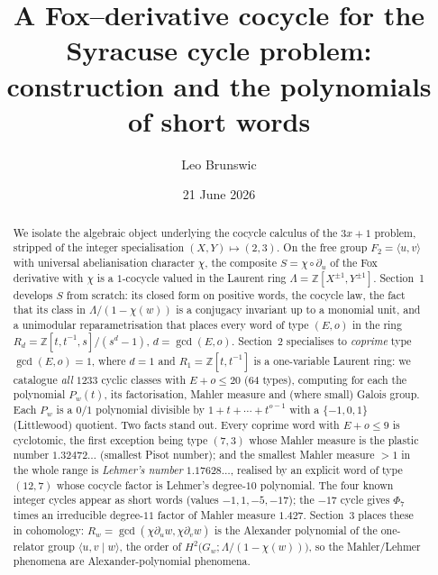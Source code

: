 \documentclass[11pt,a4paper]{article}
\title{A Fox--derivative cocycle for the Syracuse cycle problem:\\
       construction and the polynomials of short words}
\author{Leo Brunswic}
\date{21 June 2026}
\theoremstyle{bourbaki}
\theoremstyle{bourbakidef}
\newcommand{\Z}{\mathbb{Z}}
\newcommand{\Lam}{\Lambda}
\begin{document}
\maketitle

\begin{abstract}
We isolate the algebraic object underlying the cocycle calculus of the $3x+1$ problem,
stripped of the integer specialisation $(X,Y)\mapsto(2,3)$. On the free group $F_2=\langle
u,v\rangle$ with universal abelianisation character $\chi$, the composite $S=\chi\circ
\partial_u$ of the Fox derivative with $\chi$ is a $1$-cocycle valued in the Laurent ring
$\Lam=\Z[X^{\pm1},Y^{\pm1}]$. Section~1 develops $S$ from scratch: its closed form on
positive words, the cocycle law, the fact that its class in $\Lam/(1-\chi(w))$ is a
conjugacy invariant up to a monomial unit, and a unimodular reparametrisation that places
every word of type $(E,o)$ in the ring $R_d=\Z[t,t^{-1},s]/(s^d-1)$, $d=\gcd(E,o)$.
Section~2 specialises to \emph{coprime} type $\gcd(E,o)=1$, where $d=1$ and $R_1=\Z[t,t^{-1}]$
is a one-variable Laurent ring: we catalogue \emph{all} $1233$ cyclic classes with $E+o\le20$
($64$ types), computing for each the polynomial $P_w(t)$, its factorisation, Mahler measure
and (where small) Galois group. Each $P_w$ is a $0/1$ polynomial divisible by
$1+t+\cdots+t^{o-1}$ with a $\{-1,0,1\}$ (Littlewood) quotient. Two facts stand out. Every
coprime word with $E+o\le9$ is
cyclotomic, the first exception being type $(7,3)$ whose Mahler measure is the plastic number
$1.32472\ldots$ (smallest Pisot number); and the smallest Mahler measure $>1$ in the whole
range is \emph{Lehmer's number} $1.17628\ldots$, realised by an explicit word of type
$(12,7)$ whose cocycle factor is Lehmer's degree-$10$ polynomial. The four known integer cycles
appear as short words (values $-1,1,-5,-17$); the $-17$ cycle gives $\Phi_7$ times an
irreducible degree-$11$ factor of Mahler measure $1.427$. Section~3 places these in cohomology:
$R_w=\gcd(\chi\partial_u w,\chi\partial_v w)$ is the Alexander polynomial of the one-relator
group $\langle u,v\mid w\rangle$, the order of $H^2\!\big(G_w;\Lam/(1-\chi(w))\big)$, so the
Mahler/Lehmer phenomena are Alexander-polynomial phenomena.
\end{abstract}






\end{document}
